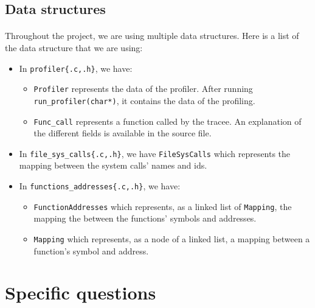\documentclass[a4paper, 11pt, oneside]{article}
\begin{document}
\subsection{Data structures}
\paragraph{}Throughout the project, we are using multiple data structures. Here is a list of the data structure that we are using:
\begin{itemize}
	\item In \texttt{profiler\{.c,.h\}}, we have:
		\begin{itemize}
			\item \texttt{Profiler} represents the data of the profiler. After running \texttt{run\_profiler(char*)}, it contains the data of the profiling.
			\item \texttt{Func\_call} represents a function called by the tracee. An explanation of the different fields is available in the source file.
		\end{itemize}
	\item In \texttt{file\_sys\_calls\{.c,.h\}}, we have \texttt{FileSysCalls} which represents the mapping between the system calls' names and ids.
	\item In \texttt{functions\_addresses\{.c,.h\}}, we have:
		\begin{itemize}
			\item \texttt{FunctionAddresses} which represents, as a linked list of \texttt{Mapping}, the mapping the between the functions' symbols and addresses.
			\item \texttt{Mapping} which represents, as a node of a linked list, a mapping between a function's symbol and address.
		\end{itemize}
\end{itemize}

\section{Specific questions}
\end{document}
